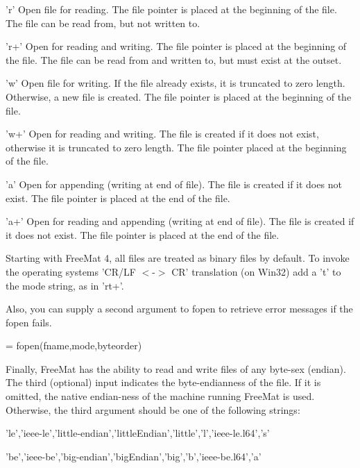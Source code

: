 \begin{DoxyItemize}
\item {\ttfamily 'r'} Open file for reading. The file pointer is placed at the beginning of the file. The file can be read from, but not written to.  
\item {\ttfamily 'r+'} Open for reading and writing. The file pointer is placed at the beginning of the file. The file can be read from and written to, but must exist at the outset.  
\item {\ttfamily 'w'} Open file for writing. If the file already exists, it is truncated to zero length. Otherwise, a new file is created. The file pointer is placed at the beginning of the file.  
\item {\ttfamily 'w+'} Open for reading and writing. The file is created if it does not exist, otherwise it is truncated to zero length. The file pointer placed at the beginning of the file.  
\item {\ttfamily 'a'} Open for appending (writing at end of file). The file is created if it does not exist. The file pointer is placed at the end of the file.  
\item {\ttfamily 'a+'} Open for reading and appending (writing at end of file). The file is created if it does not exist. The file pointer is placed at the end of the file.  
\end{DoxyItemize}Starting with Free\-Mat 4, all files are treated as binary files by default. To invoke the operating systems 'C\-R/\-L\-F $<$-\/$>$ C\-R' translation (on Win32) add a 't' to the mode string, as in 'rt+'.

Also, you can supply a second argument to {\ttfamily fopen} to retrieve error messages if the {\ttfamily fopen} fails. \begin{DoxyVerb}  [fp,messages] = fopen(fname,mode,byteorder)
\end{DoxyVerb}


Finally, Free\-Mat has the ability to read and write files of any byte-\/sex (endian). The third (optional) input indicates the byte-\/endianness of the file. If it is omitted, the native endian-\/ness of the machine running Free\-Mat is used. Otherwise, the third argument should be one of the following strings\-: 
\begin{DoxyItemize}
\item {\ttfamily 'le','ieee-\/le','little-\/endian','little\-Endian','little','l','ieee-\/le.\-l64','s'}  
\item {\ttfamily 'be','ieee-\/be','big-\/endian','big\-Endian','big','b','ieee-\/be.\-l64','a'}  
\end{DoxyItemize}

